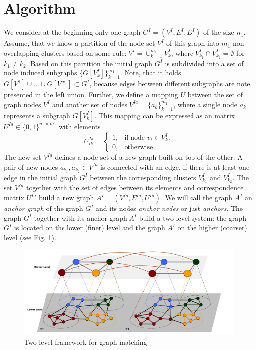 \section{Algorithm}
We consider at the beginning only one graph $G^I=(V^I,E^I,D^I)$ of the size $n_1$. Assume, that we know a partition of the node set $V^I$ of this graph into $m_1$ non-overlapping clusters based on some rule: $V^I=\cup_{k=1}^{m_1}V^I_k$, where $V^I_{k_1}\cap V^I_{k_2}=\emptyset$ for $k_1\not=k_2$. Based on this partition the initial graph $G^I$ is subdivided into a set of node induced subgraphs $\{G[V^I_k]\}_{k=1}^{m_1}$. Note, that it holds $G[V^1]\cup\dots\cup G[V^{m_1}]\subset G^I$, because edges between different subgraphs are note presented in the left union.
Further, we define a mapping $U$ between the set of graph nodes $V^I$ and another set of nodes $V^{Ia}=\{a_k\}_{k=1}^{m_1}$, where a single node $a_k$ represents a subgraph  $G[V^I_k]$. This mapping can be expressed as an matrix $U^{Ia}\in\{0,1\}^{n_1\times m_1}$ with elements 
\begin{equation}\label{eq:matrixU}
U^{Ia}_{ik} = \begin{cases} 1, & \mbox{if node } v_i\in V^I_k,    \\
0, & \mbox{otherwise}.\end{cases}
\end{equation}
The new set $V^{Ia}$ defines a node set of a new graph built on top of the other. A pair of new nodes $a_{k_1},a_{k_2}\in V^{Ia}$ is connected with an edge, if there is at least one edge in the initial graph $G^I$ between the corresponding clusters $V^I_{k_1}$ and $V^I_{k_2}$. The set $V^{Ia}$ together with the set of edges between its elements and correspondence matrix $U^{Ia}$ build a new graph $A^I=(V^{Ia},E^{Ia},U^{Ia})$. We will call the graph $A^I$ an \emph{anchor graph} of the graph $G^I$ and its nodes \emph{anchor nodes} or just \emph{anchors}. The graph $G^I$ together with its anchor graph $A^I$ build a two level system: the graph $G^I$ is located on the lower (finer) level and the graph $A^I$ on the higher (coarser) level (see Fig. \ref{fig:2levels}).

\begin{figure} [h!]
	\centering
	\includegraphics[scale=0.35]{chapter2/fig/twolevels3.pdf}
	\caption{Two level framework for graph matching} \label{fig:2levels}
\end{figure}

